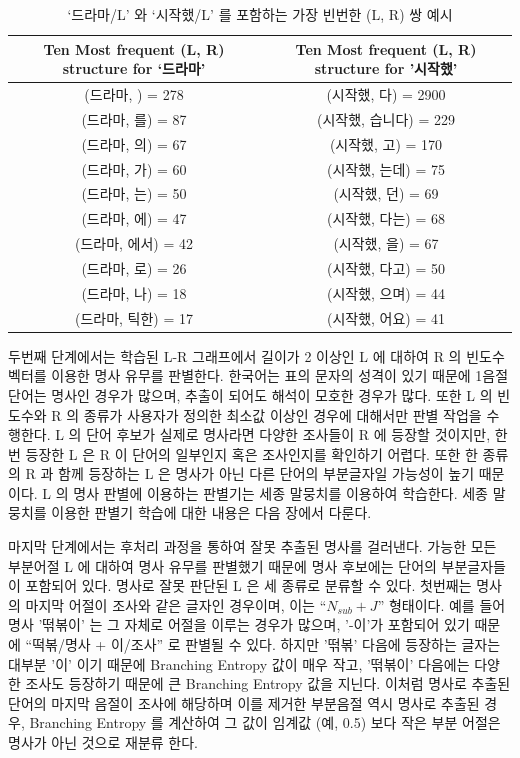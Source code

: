 \documentclass[11pt]{article}
\begin{document}
\begin{table}[H]
\small
\centering
\caption{‘드라마/L’ 와 ‘시작했/L’ 를 포함하는 가장 빈번한 (L, R) 쌍 예시}
\label{tab:lr_drama_examples}
\begin{tabular}{|c|c|}
\hline
\rowcolor[HTML]{EFEFEF} 
\textbf{Ten Most frequent (L, R) structure for ‘드라마’} & \textbf{Ten Most frequent (L, R) structure for '시작했’} \\ \hline
(드라마, ) = 278 & (시작했, 다) = 2900 \\ \hline
(드라마, 를) = 87 & (시작했, 습니다) = 229 \\ \hline
(드라마, 의) = 67 & (시작했, 고) = 170  \\ \hline
(드라마, 가) = 60 & (시작했, 는데) = 75  \\ \hline
(드라마, 는) = 50 & (시작했, 던) = 69   \\ \hline
(드라마, 에) = 47 & (시작했, 다는) = 68  \\ \hline
(드라마, 에서) = 42& (시작했, 을) = 67   \\ \hline
(드라마, 로) = 26 & (시작했, 다고) = 50  \\ \hline
(드라마, 나) = 18 & (시작했, 으며) = 44  \\ \hline
(드라마, 틱한) = 17& (시작했, 어요) = 41  \\ \hline
\end{tabular}%
\end{table}

두번째 단계에서는 학습된 L-R 그래프에서 길이가 2 이상인 L 에 대하여 R 의 빈도수 벡터를 이용한 명사 유무를 판별한다.
한국어는 표의 문자의 성격이 있기 때문에 1음절 단어는 명사인 경우가 많으며, 추출이 되어도 해석이 모호한 경우가 많다.
또한 L 의 빈도수와 R 의 종류가 사용자가 정의한 최소값 이상인 경우에 대해서만 판별 작업을 수행한다.
L 의 단어 후보가 실제로 명사라면 다양한 조사들이 R 에 등장할 것이지만, 한 번 등장한 L 은 R 이 단어의 일부인지 혹은 조사인지를 확인하기 어렵다.
또한 한 종류의 R 과 함께 등장하는 L 은 명사가 아닌 다른 단어의 부분글자일 가능성이 높기 때문이다.
L 의 명사 판별에 이용하는 판별기는 세종 말뭉치를 이용하여 학습한다.
세종 말뭉치를 이용한 판별기 학습에 대한 내용은 다음 장에서 다룬다.

마지막 단계에서는 후처리 과정을 통하여 잘못 추출된 명사를 걸러낸다.
가능한 모든 부분어절 L 에 대하여 명사 유무를 판별했기 때문에 명사 후보에는 단어의 부분글자들이 포함되어 있다.
명사로 잘못 판단된 L 은 세 종류로 분류할 수 있다.
첫번째는 명사의 마지막 어절이 조사와 같은 글자인 경우이며, 이는 “$N_{sub} + J$” 형태이다.
예를 들어 명사 '떢볶이' 는 그 자체로 어절을 이루는 경우가 많으며, '-이'가 포함되어 있기 때문에 “떡볶/명사 + 이/조사” 로 판별될 수 있다.
하지만 '떢볶' 다음에 등장하는 글자는 대부분 '이' 이기 때문에 Branching Entropy 값이 매우 작고, '떢볶이' 다음에는 다양한 조사도 등장하기 때문에 큰 Branching Entropy 값을 지닌다.
이처럼 명사로 추출된 단어의 마지막 음절이 조사에 해당하며 이를 제거한 부분음절 역시 명사로 추출된 경우, Branching Entropy 를 계산하여 그 값이 임계값 (예, 0.5) 보다 작은 부분 어절은 명사가 아닌 것으로 재분류 한다.
\end{document}
